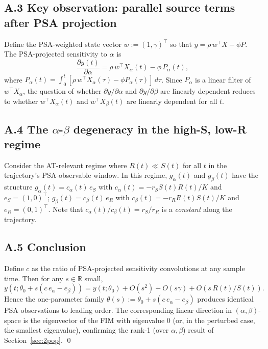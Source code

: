 \documentclass[11pt]{article}
\newcommand{\R}{\mathbb{R}}
\begin{document}
\subsection*{A.3 Key observation: parallel source terms after PSA projection}

Define the PSA-weighted state vector $w := (1, \gamma)^\top$ so that
$y = \rho\, w^\top X - \phi P$. The PSA-projected sensitivity to $\alpha$ is
\begin{equation*}
\frac{\partial y(t)}{\partial \alpha} = \rho\, w^\top X_\alpha(t) - \phi\, P_\alpha(t),
\end{equation*}
where $P_\alpha(t) = \int_0^t [\rho\, w^\top X_\alpha(\tau) - \phi P_\alpha(\tau)]\, d\tau$.
Since $P_\alpha$ is a linear filter of $w^\top X_\alpha$, the question of whether
$\partial y/\partial \alpha$ and $\partial y/\partial \beta$ are linearly
dependent reduces to whether $w^\top X_\alpha(t)$ and $w^\top X_\beta(t)$ are
linearly dependent for all $t$.

\subsection*{A.4 The $\alpha$-$\beta$ degeneracy in the high-S, low-R regime}

Consider the AT-relevant regime where $R(t) \ll S(t)$ for all $t$ in the
trajectory's PSA-observable window. In this regime, $g_\alpha(t)$ and $g_\beta(t)$
have the structure $g_\alpha(t) = c_\alpha(t)\, e_S$ with
$c_\alpha(t) = -r_S S(t) R(t)/K$ and $e_S = (1, 0)^\top$;
$g_\beta(t) = c_\beta(t)\, e_R$ with $c_\beta(t) = -r_R R(t) S(t)/K$ and
$e_R = (0, 1)^\top$. Note that $c_\alpha(t) / c_\beta(t) = r_S / r_R$ is a
\emph{constant} along the trajectory.

\subsection*{A.5 Conclusion}

Define $c$ as the ratio of PSA-projected sensitivity convolutions at any sample
time. Then for any $s \in \R$ small,
\begin{equation*}
y(t; \theta_0 + s(c\, e_\alpha - e_\beta)) = y(t; \theta_0) + O(s^2) + O(s\gamma) + O(s\, R(t)/S(t)).
\end{equation*}
Hence the one-parameter family $\theta(s) := \theta_0 + s(c\, e_\alpha - e_\beta)$
produces identical PSA observations to leading order. The corresponding linear
direction in $(\alpha, \beta)$-space is the eigenvector of the FIM with
eigenvalue 0 (or, in the perturbed case, the smallest eigenvalue), confirming
the rank-1 (over $\alpha, \beta$) result of Section~\ref{sec:2pop}. \qed
\end{document}
